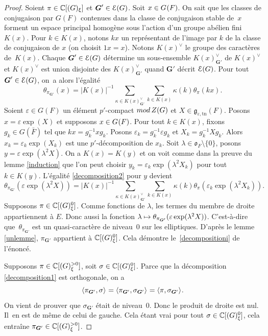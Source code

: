 \documentclass[11pt]{article}
\numberwithin{equation}{section}\providecommand{\og}{«\,}\providecommand{\fg}{\,»}
\let\mathcal \EuScript
\newcommand{\NoChangel}[1]{%
\expandafter\let\csname old\string#1\endcsname=#1
\let#1=\relax
\newcommand{#1}{\mathcode`l="716C\csname old\string#1\endcsname\mathcode`l="7160 }%
}
\let\epsilon\varepsilon
\let\<\langle
\let\>\rangle
\newcommand\mto{\mathchoice{\longmapsto}{\mapsto}{\mapsto}{\mapsto}}
\newcommand{\rmod}{\textup{mod}\,}
\newcommand{\frg}{\mathfrak{g}}
\newcommand{\fro}{\mathfrak{o}}
\newcommand{\rell}{\mathrm{ell}} \NoChangel{\rell}
\newcommand{\Ell}{\mathrm{Ell}} \NoChangel{\Ell}
\newcommand{\tn}{\mathrm{tn}}
\newcommand{\bG}{\boldsymbol{G}}
\newcommand{\cE}{\mathcal{E}}
\newcommand{\CC}{\mathbb{C}}
\theoremstyle{plain}
\theoremstyle{definition}
\begin{document}
\begin{proof}
Soient $\pi\in \CC[\Ell(G)_{\xi}]$ et $\bG'\in \cE(G)$. Soit $x\in G_{\rell}(F)$. On sait que les classes de conjugaison par $G(F)$ contenues dans la classe de conjugaison stable de~$x$ forment un espace principal homogène sous l'action d'un groupe abélien fini~$K(x)$. Pour $k\in K(x)$, notons $kx$ un représentant de l'image par $k$ de la classe de conjugaison de $x$ (on choisit $1x=x$). Notons $K(x)^{\vee}$ le groupe des caractères de~$K(x)$. Chaque $\bG'\in \cE(G)$ détermine un sous-ensemble $K(x)^{\vee}_{\bG'}$ de $K(x)^{\vee}$ et $K(x)^{\vee}$ est union disjointe des $K(x)^{\vee}_{\bG'}$ quand $\bG'$ décrit $\cE(G)$. Pour tout $\bG'\in \cE(G)$, on~a alors l'égalité
\begin{equation}\tag{2}\label{decomposition2}
\theta_{\pi_{\bG'}}(x)=\vert K(x)\vert ^{-1}\sum_{\kappa\in K(x)^{\vee}_{\bG'}}\sum_{k\in K(x)}\kappa(k)\theta_{\pi}(kx).
\end{equation}
Soient $\epsilon\in G(F)$ un élément $p'$-compact $\rmod Z(G)$ et $X\in \frg_{\epsilon,\tn}(F)$. Posons $x=\epsilon \exp(X)$ et supposons $x\in G_{\rell}(F)$. Pour tout $k\in K(x)$, fixons $g_{k}\in G(\bar{F})$ tel que $kx=g_{k}^{-1}xg_{k}$. Posons $\epsilon_{k}=g_{k}^{-1}\epsilon g_{k}$ et $X_{k}=g_{k}^{-1} X g_{k}$. Alors $x_{k}=\epsilon_{k}\exp(X_{k})$ est une $p'$-décomposition de $x_{k}$. Soit $\lambda\in \fro_{F}\setminus\{0\}$, posons $y=\epsilon \exp(\lambda^2 X)$. On a $K(x)=K(y)$ et on voit comme dans la preuve du lemme \ref{induction} que l'on peut choisir $y_{k}=\epsilon_{k}\exp(\lambda^2 X_{k})$ pour tout $k\in K(y)$. L'égalité \eqref{decomposition2} pour $y$ devient
\[
\theta_{\pi_{\bG'}}(\epsilon \exp(\lambda^2 X))=\vert K(x)\vert ^{-1}\sum_{\kappa\in K(x)^{\vee}_{\bG'}}\sum_{k\in K(x)}\kappa(k)\theta_{\pi}(\epsilon_{k}\exp(\lambda^2 X_{k})).
\]
Supposons $\pi\in \CC[\Ell(G)^0_{\xi}]$. Comme fonctions de $\lambda$, les termes du membre de droite appartiennent à $E$. Donc aussi la fonction $\lambda\mto \theta_{\pi_{\bG'}}(\epsilon \exp(\lambda^2 X))$. C'est-à-dire que~$\theta_{\pi_{\bG'}}$ est un quasi-caractère de niveau~$0$ sur les elliptiques. D'après le lemme \ref{unlemme}, $\pi_{\bG'}$ appartient à $\CC[\Ell(G)_{\xi}^0]$. Cela démontre le~\eqref{decompositioni} de l'énoncé.

Supposons $\pi\in \CC[\Ell(G)^{>0}_{\xi}]$, soit $\sigma\in \CC[\Ell(G)^0_{\xi}]$. Parce que la décomposition \eqref{decomposition1} est orthogonale, on a
\[
\<\pi_{\bG'},\sigma\>_{\rell}=\<\pi_{\bG'},\sigma_{\bG'}\>_{\rell}=\<\pi,\sigma_{\bG'}\>_{\rell}.
\]
On vient de prouver que $\sigma_{\bG'}$ était de niveau~$0$. Donc le produit de droite est nul. Il~en est de même de celui de gauche. Cela étant vrai pour tout $\sigma\in \CC[\Ell(G)^0_{\xi}]$, cela entraîne $\pi_{\bG'}\in \CC[\Ell(G)^{>0}_{\xi}]$.
\end{proof}
\end{document}
